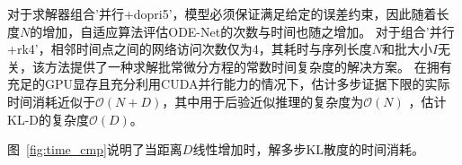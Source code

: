 对于求解器组合'并行+dopri5'，模型必须保证满足给定的误差约束，因此随着长度$N$的增加，自适应算法评估ODE-Net的次数与时间也随之增加。
对于组合'并行+rk4'，相邻时间点之间的网络访问次数仅为4，其耗时与序列长度$N$和批大小$I$无关，该方法提供了一种求解批常微分方程的常数时间复杂度的解决方案。
在拥有充足的GPU显存且充分利用CUDA并行能力的情况下，估计多步证据下限的实际时间消耗近似于$\mathcal{O}(N+D)$，其中用于后验近似推理的复杂度为$\mathcal{O}(N)$ ，估计KL-D的复杂度$\mathcal{O}(D)$。

图~\ref{fig:time_cmp}说明了当距离$D$线性增加时，解多步KL散度的时间消耗。

